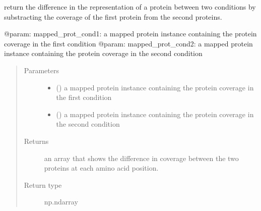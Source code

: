 \documentclass[letterpaper,10pt,english]{sphinxmanual}
\begin{document}
\begin{fulllineitems}
\label{\detokenize{IPTK.Analysis:IPTK.Analysis.AnalysisFunction.compute_difference_in_representation}}
return the difference in the representation of a protein between two conditions
by substracting the coverage of the first protein from the second proteins.

@param: mapped\_prot\_cond1: a mapped protein instance containing the protein coverage in the first condition
@param: mapped\_prot\_cond2: a mapped protein instance containing the protein coverage in the second condition
\begin{quote}\begin{description}
\item[{Parameters}] \leavevmode\begin{itemize}
\item {} 
 () \textendash{} a mapped protein instance containing the protein coverage in the first condition

\item {} 
 () \textendash{} a mapped protein instance containing the protein coverage in the second condition

\end{itemize}

\item[{Returns}] \leavevmode
an array that shows the difference in coverage between the two proteins at each amino acid position.

\item[{Return type}] \leavevmode
np.ndarray

\end{description}\end{quote}

\end{fulllineitems}

\end{document}
